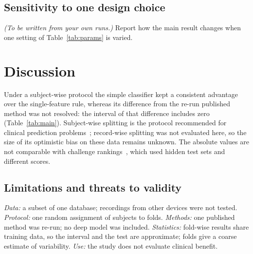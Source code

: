 \subsection{Sensitivity to one design choice}
\emph{(To be written from your own runs.)} Report how the main result changes when one
setting of Table~\ref{tab:params} is varied.

\section{Discussion}
\label{sec:discussion}

Under a subject-wise protocol the simple classifier kept a consistent advantage over the
single-feature rule, whereas its difference from the re-run published method was not resolved:
the interval of that difference includes zero (Table~\ref{tab:main}). Subject-wise splitting
is the protocol recommended for clinical prediction problems~\cite{Saeb2017}; record-wise
splitting was not evaluated here, so the size of its optimistic bias on these data remains
unknown. The absolute values are not comparable with challenge
rankings~\cite{Clifford2016,Reyna2023}, which used hidden test sets and different scores.

\subsection{Limitations and threats to validity}
\label{sec:limits}
\emph{Data:} a subset of one database; recordings from other devices were not tested.
\emph{Protocol:} one random assignment of subjects to folds. \emph{Methods:} one published
method was re-run; no deep model was included. \emph{Statistics:} fold-wise results share
training data, so the interval and the test are approximate;  folds give a coarse
estimate of variability. \emph{Use:} the study does not evaluate clinical benefit.

